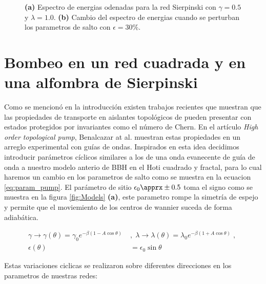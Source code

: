 \begin{figure}[h!]
\begin{subfigure}[b!]{0.5 \textwidth}
    \end{subfigure}\hspace*{-0.9em}
       \caption{\textbf{(a)} Espectro de energias odenadas para la red Sierpinski con $\gamma = 0.5$ y $\lambda = 1.0$. \textbf{(b)} Cambio del espectro de energias cuando se perturban los parametros de salto con $\epsilon = 30\%$.}
       \label{fig:spectre_fractal_epsi}
\end{figure}

\section{Bombeo en un red cuadrada y en una alfombra de Sierpinski}

Como se mencionó en la introducción existen trabajos recientes que muestran que las propiedades de transporte en aislantes topológicos de pueden presentar con estados protegidos por invariantes como el número de Chern. En el artículo \textit{High order topological pump}\cite{benalcazar2020higher}, Benalcazar at al. muestran estas propiedades en un arreglo experimental con guías de ondas. Inspirados en esta idea decidimos introducir parámetros cíclicos similares a los de una onda evanecente de guía de onda a nuestro modelo anterio de BBH en el Hoti cuadrado y fractal, para lo cual haremos un cambio en los parametros de salto como se muestra en la ecuacion \ref{eq:param_pump}. El parámetro de sitio $\epsilon_0 \apprx \pm 0.5$ toma el signo como se muestra en la figura \ref{fig:Models} \textbf{(a)}, este parametro rompe la simetría de espejo y permite que el moviemiento de los centros de wannier suceda de forma adiabática.

\begin{align}
    \label{eq:param_pump}
    \nonumber\gamma \rightarrow \gamma (\theta) = \gamma_0 e^{\displaystyle-\beta(1 - A \cos \theta )} \; &,\;  \lambda \rightarrow \lambda(\theta) = \lambda_0 e^{\displaystyle-\beta( 1 + A \cos \theta )} \;,\; \\  \epsilon(\theta) &= \epsilon_0 \sin \theta
\end{align}

Estas variaciones ciclicas se realizaron sobre diferentes direcciones en los parametros de nuestras redes: 

